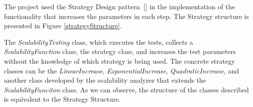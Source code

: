 The project used the Strategy Design pattern~[\cite{GOF1995}] in the implementation of the functionality that increases the parameters in each step. The Strategy structure is presented in Figure \ref{strategyStructure}. 

The \emph{ScalabilityTesting} class, which executes the tests, collects a \emph{ScalabilityFunction} class, the strategy class, and increases the test parameters without the knowledge of which strategy is being used. The concrete strategy classes can be the \emph{LinearIncrease}, \emph{ExponentialIncrease}, \emph{QuadraticIncrease}, and another class developed by the scalability analyzer that extends the \emph{ScalabilityFunciton} class. As we can observe, the structure of the classes described is equivalent to the Strategy Structure.


